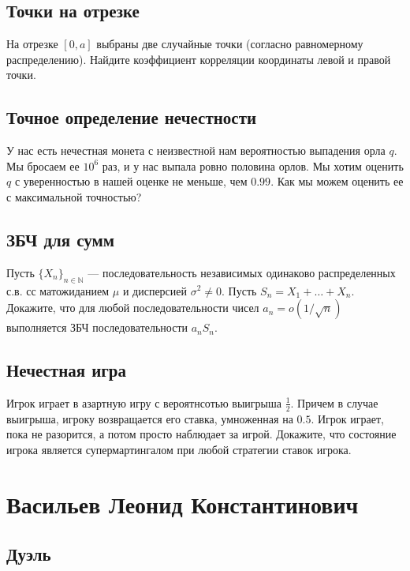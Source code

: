 \documentclass[12pt]{article}
\newcommand\N{\mathbb{N}}
\begin{document}
\subsection{Точки на отрезке}

На отрезке $[0, a]$ выбраны две случайные точки (согласно равномерному распределению). Найдите коэффициент корреляции координаты левой и правой точки. 



\subsection{Точное определение нечестности}

У нас есть нечестная монета с неизвестной нам вероятностью выпадения орла $q$. Мы бросаем ее $10^6$ раз, и у нас выпала ровно половина орлов. Мы хотим оценить $q$ с уверенностью в нашей оценке не меньше, чем $0.99$. Как мы можем оценить ее с максимальной точностью? 



\subsection{ЗБЧ для сумм}
Пусть $\{X_n\}_{n \in \N}$ --- последовательность независимых одинаково распределенных с.в. сс матожиданием $\mu$ и дисперсией $\sigma^2 \ne 0$. Пусть $S_n = X_1 + \dots + X_n$. Докажите, что для любой последовательности чисел $a_n = o(1/\sqrt{n})$ выполняется ЗБЧ последовательности $a_n S_n$.



\subsection{Нечестная игра}

Игрок играет в азартную игру с вероятнсотью выигрыша $\frac{1}{2}$. Причем в случае выигрыша, игроку возвращается его ставка, умноженная на $0.5$. Игрок играет, пока не разорится, а потом просто наблюдает за игрой. Докажите, что состояние игрока является супермартингалом при любой стратегии ставок игрока.



\newpage
\section{Васильев Леонид Константинович}

\subsection{Дуэль}
\end{document}
